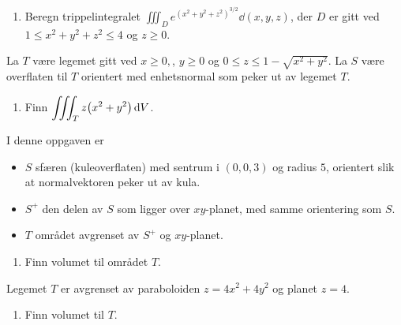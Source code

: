 

\oppgave[V2017, Oppgave 4]

\begin{enumerate}
  \item Beregn trippelintegralet $\displaystyle \iiint_D e^{(x^2 + y^2 +
    z^{2})^{3/2}}\dd(x,y,z)$, der $D$ er gitt ved \\ $1 \leq x^2 + y^2 + z^2
    \leq 4$ og $z \geq 0$.
\end{enumerate}


\oppgave[K2013, Oppgave 7] La $T$ være legemet gitt ved $x \geq 0,$, $y \geq 0$
og $0 \leq z \leq 1 - \sqrt{x^2 + y^2}$. La $S$ være overflaten til $T$
orientert med enhetsnormal som peker ut av legemet $T$.

\begin{enumerate}
  \item Finn $\displaystyle \iiint_T z\bigl( x^2 + y^2 \bigr) \mathop{}\! \mathrm{d} V\mathop{}\!$.
\end{enumerate}


\oppgave[V2013, Oppgave 6] I denne oppgaven er

\begin{itemize}
  \item $S$ sfæren (kuleoverflaten) med sentrum i $(0,0,3)$ og radius $5$,
    orientert slik at normalvektoren peker ut av kula.
  \item $S^+$ den delen av $S$ som ligger over $xy$-planet, med samme
    orientering som $S$.
  \item $T$ området avgrenset av $S^+$ og $xy$-planet.
\end{itemize}

\begin{enumerate}
  \item Finn volumet til området $T$.
\end{enumerate}

\oppgave[K2012, Oppgave 6] Legemet $T$ er avgrenset av paraboloiden $z = 4x^2 +
4y^2$ og planet $z = 4$.
%
\begin{enumerate}
  \item Finn volumet til $T$.
\end{enumerate}

